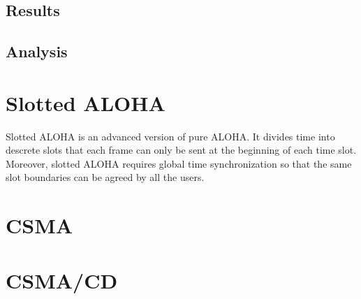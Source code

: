 \documentclass[11pt,oneside,a4paper]{report}
\begin{document}
\subsection*{Results}

\subsection*{Analysis}

\section*{Slotted ALOHA}
Slotted ALOHA is an advanced version of pure ALOHA. It divides time into descrete slots that each frame can only be sent at the beginning of each time slot. Moreover, slotted ALOHA requires global time synchronization so that the same slot boundaries can be agreed by all the users.

\section*{CSMA}

\section*{CSMA/CD}
\end{document}
